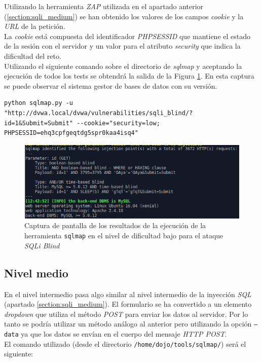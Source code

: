 \documentclass{article}
\begin{document}
Utilizando la herramienta \textit{ZAP} utilizada en el apartado anterior (\ref{section:sqli_medium}) se han obtenido los valores de los campos \textit{cookie} y la \textit{URL} de la petición.\\
La \textit{cookie} está compuesta del identificador \textit{PHPSESSID} que mantiene el estado de la sesión con el servidor y un valor para el atributo \textit{security} que indica la dificultad del reto.\\
Utilizando el siguiente comando sobre el directorio de \textit{sqlmap} y aceptando la ejecución de todos los tests se obtendrá la salida de la Figura \ref{fig:sql_injection_blind_low}. En esta captura se puede observar el sistema gestor de bases de datos con su versión.

\begin{lstlisting}
python sqlmap.py -u "http://dvwa.local/dvwa/vulnerabilities/sqli_blind/?id=1&Submit=Submit" --cookie="security=low; PHPSESSID=ehq3cpfgeqtdg5spr0kaa4isq4"
\end{lstlisting}

\begin{figure}[h!]
    \centering
    \includegraphics[scale=0.8]{images/sql_injection_blind_low.png}
    \caption{Captura de pantalla de los resultados de la ejecución de la herramienta \texttt{sqlmap} en el nivel de dificultad bajo para el ataque \textit{SQLi Blind}}
    \label{fig:sql_injection_blind_low}
\end{figure}


\subsection{Nivel medio}

En el nivel intermedio pasa algo similar al nivel intermedio de la inyección \textit{SQL} (apartado \ref{section:sqli_medium}). El formulario se ha convertido a un elemento \textit{dropdown} que utiliza el método \textit{POST} para enviar los datos al servidor. Por lo tanto se podría utilizar un método análogo al anterior pero utilizando la opción \texttt{--data} ya que los datos se envían en el cuerpo del mensaje \textit{HTTP POST}.\\
El comando utilizado (desde el directorio \texttt{/home/dojo/tools/sqlmap/}) será el siguiente:
\end{document}
